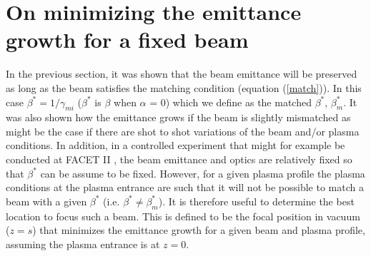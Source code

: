 \documentclass[%
reprint, superscriptaddress,
 amsmath,amssymb, aps,
prstab,
]{revtex4-2}
\begin{document}
\section{On minimizing the emittance growth for a fixed beam} 
In the previous section, it was shown that the beam emittance will be preserved as long as
the beam satisfies the matching condition (equation (\ref{match})). In this case $\beta^* = 1/\gamma_{mi}$ ($\beta^*$ is $\beta$ when $\alpha$ = 0) which we define as the matched $\beta^*$, $\beta_m^*$.
It was also shown how the emittance grows if the beam is slightly mismatched as might be the case if there are shot to shot variations of the beam and/or plasma conditions. In addition,  in a controlled experiment that might for example be conducted at FACET II \cite{PWFA_FACETII}, the beam emittance and optics are relatively fixed so that $\beta^{*}$ can be assume to be fixed. However, for a given plasma profile  the plasma conditions at the plasma entrance are such that it will not be possible to match a beam with a given $\beta^*$ (i.e. $\beta^* \neq \beta_m^*$). 
It is therefore  useful to determine the best location to focus such a beam.
This is defined to be the focal position in vacuum ($z=s$)  that minimizes the emittance growth for a given beam and plasma profile, assuming the plasma entrance is at $z =0$. %
\end{document}
